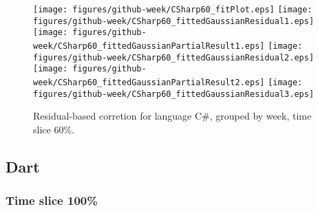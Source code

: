 \begin{figure}[hb]
\centering
{}
{\texttt{[image: figures/github-week/CSharp60\_fitPlot.eps]}}
{\texttt{[image: figures/github-week/CSharp60\_fittedGaussianResidual1.eps]}}
{\texttt{[image: figures/github-week/CSharp60\_fittedGaussianPartialResult1.eps]}}
{\texttt{[image: figures/github-week/CSharp60\_fittedGaussianResidual2.eps]}}
{\texttt{[image: figures/github-week/CSharp60\_fittedGaussianPartialResult2.eps]}}
{\texttt{[image: figures/github-week/CSharp60\_fittedGaussianResidual3.eps]}}
\caption{Residual-based corretion for language C\#, grouped by week, time slice 60\%.}
\end{figure}


\clearpage 
\newpage 


\subsection{Dart}

\FloatBarrier

\subsubsection{Time slice 100\%}

